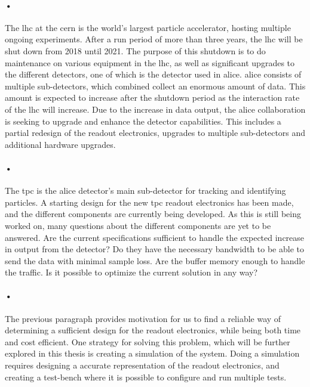 \documentclass[a4paper, 12pt, openright, twoside]{report}
\begin{document}
\paragraph{•}
The \gls{lhc} at the \gls{cern} is the world's largest particle accelerator, hosting multiple ongoing experiments.
After a run period of more than three years, the \gls{lhc} will be shut down from 2018 until 2021\cite{ls2}.
The purpose of this shutdown is to do maintenance on various equipment in the \gls{lhc}, as well as significant upgrades to the different detectors, one of which is the detector used in \gls{alice}.
\gls{alice} consists of multiple sub-detectors, which combined collect an enormous amount of data.
This amount is expected to increase after the shutdown period as the interaction rate of the \gls{lhc} will increase.
Due to the increase in data output, the \gls{alice} collaboration is seeking to upgrade and enhance the detector capabilities\cite{alice-upgrade}.
This includes a partial redesign of the readout electronics, upgrades to multiple sub-detectors and additional hardware upgrades.

\paragraph{•}
The \gls{tpc} is the \gls{alice} detector's main sub-detector for tracking and identifying particles.
A starting design for the new \gls{tpc} readout electronics has been made, and the different components are currently being developed.
As this is still being worked on, many questions about the different components are yet to be answered.
Are the current specifications sufficient to handle the expected increase in output from the detector?
Do they have the necessary bandwidth to be able to send the data with minimal sample loss.
Are the buffer memory enough to handle the traffic.
Is it possible to optimize the current solution in any way?

\paragraph{•}
The previous paragraph provides motivation for us to find a reliable way of determining a sufficient design for the readout electronics, while being both time and cost efficient.
One strategy for solving this problem, which will be further explored in this thesis is creating a simulation of the system.
Doing a simulation requires designing a accurate representation of the readout electronics, and creating a test-bench where it is possible to configure and run multiple tests.
\end{document}

